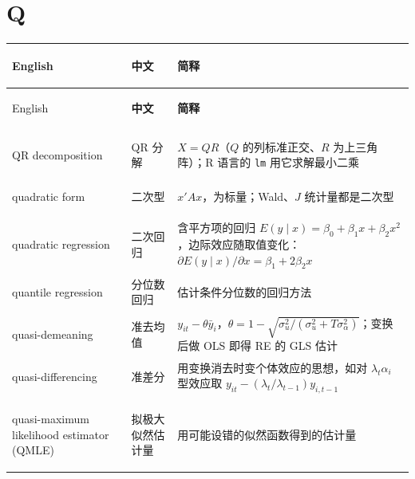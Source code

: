 \section*{Q}
\begin{longtable}{@{}>{\bfseries\boldmath\raggedright\arraybackslash}p{4.6cm}>{\raggedright\arraybackslash}p{3.2cm}>{\raggedright\arraybackslash}p{\dimexpr\textwidth-7.8cm-4\tabcolsep\relax}@{}}
\toprule
English & \textbf{中文} & \textbf{简释}\\
\midrule
\endfirsthead
\toprule
English & \textbf{中文} & \textbf{简释}\\
\midrule
\endhead
\midrule
\multicolumn{3}{r@{}}{\footnotesize\itshape （续下页）}\\
\endfoot
\bottomrule
\endlastfoot
QR decomposition & QR 分解 & $X=QR$（$Q$ 的列标准正交、$R$ 为上三角阵）；R 语言的 \texttt{lm} 用它求解最小二乘 \\
quadratic form & 二次型 & $x'Ax$，为标量；Wald、$J$ 统计量都是二次型 \\
quadratic regression & 二次回归 & 含平方项的回归 $E(y\mid x)=\beta_0+\beta_1x+\beta_2x^2$，边际效应随取值变化：$\partial E(y\mid x)/\partial x=\beta_1+2\beta_2x$ \\
quantile regression & 分位数回归 & 估计条件分位数的回归方法 \\
quasi-demeaning & 准去均值 & $y_{it}-\theta\bar y_i$，$\theta=1-\sqrt{\sigma_u^2/(\sigma_u^2+T\sigma_\alpha^2)}$；变换后做 OLS 即得 RE 的 GLS 估计 \\
quasi-differencing & 准差分 & 用变换消去时变个体效应的思想，如对 $\lambda_t\alpha_i$ 型效应取 $y_{it}-(\lambda_t/\lambda_{t-1})y_{i,t-1}$ \\
quasi-maximum likelihood estimator (QMLE) & 拟极大似然估计量 & 用可能设错的似然函数得到的估计量 \\
\end{longtable}

\par{}\ifdim\dimexpr\pagegoal-\pagetotal\relax<16\baselineskip\newpage\fi
